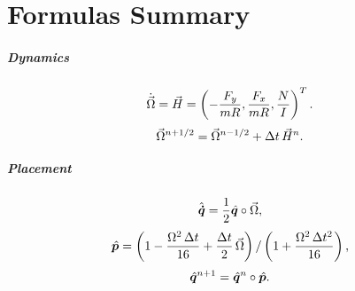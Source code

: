 
\chapter{Formulas Summary}

\paragraph{Dynamics}

\begin{equation}\label{eq:dynamicsH-x}
  \dot{{\vec{\Omega}}} = {\vec{H}} = \left( -\frac{F_y}{mR}, \frac{F_x}{mR},
  \frac{N}{I} \right)^T.
\end{equation}
\begin{equation}
  {\vec{\Omega}}^{n+1/2} = {\vec{\Omega}}^{n-1/2} + \Delta t\,{\vec{H}}^n.
\end{equation}

\paragraph{Placement}

\begin{equation}\label{eq:positionomega-x}
  {\hat{\bm{\dot q}}} = \frac{1}{2}{\hat{\bm{q}}}\circ{\vec{\Omega}},
\end{equation}
\begin{equation}
  {\hat{\bm{p}}} = \left(1 - \frac{\Omega^2\,\Delta t}{16} + \frac{\Delta
    t}{2}\,{\vec{\Omega}} \right) / \left( 1 +\frac{ \Omega^2\,\Delta
    t^2}{16}\right),
\end{equation}
\begin{equation}
  {\hat{\bm{q}}}^{n+1} = {\hat{\bm{q}}}^{n} \circ {\hat{\bm{p}}}.
\end{equation}

